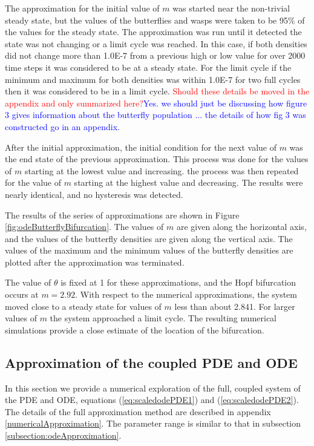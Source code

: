 \documentclass[review,authoryear]{elsarticle}
\begin{document}
The approximation for the initial value of $m$ was started near the
non-trivial steady state, but the values of the butterflies and wasps
were taken to be 95\% of the values for the steady state. The
approximation was run until it detected the state was not changing or
a limit cycle was reached. In this case, if both densities did not
change more than 1.0E-7 from a previous high or low value for over
2000 time steps it was considered to be at a steady state. For the
limit cycle if the minimum and maximum for both densities was within
1.0E-7 for two full cycles then it was considered to be in a limit
cycle. \textcolor{red}{Should these details be moved in the appendix and only summarized here?}\textcolor{blue}{Yes.  we should just be discussing how figure 3 gives information about the butterfly population ... the details of how fig 3 was constructed go in an appendix.}

After the initial approximation, the initial condition for the next
value of $m$ was the end state of the previous approximation. This
process was done for the values of $m$ starting at the lowest value
and increasing. the process was then repeated for the value of $m$
starting at the highest value and decreasing. The results were nearly
identical, and no hysteresis was detected.

The results of the series of approximations are shown in Figure
\ref{fig:odeButterflyBifurcation}. The values of $m$ are given along
the horizontal axis, and the values of the butterfly densities are
given along the vertical axis. The values of the maximum and the
minimum values of the butterfly densities are plotted after the
approximation was terminated.

The value of $\theta$ is fixed at 1 for these approximations, and the Hopf bifurcation occurs at $m=2.92$. With respect to the numerical approximations, the system moved close to a steady state for values of $m$ less than about 2.841. For larger values of $m$ the system approached a limit
cycle. The resulting numerical simulations provide a close estimate of the location of the bifurcation.

\subsection{Approximation of the coupled PDE and ODE}

In this section we provide a  numerical exploration of the full, coupled system of the PDE and
ODE, equations (\ref{eq:scaledodePDE1}) and (\ref{eq:scaledodePDE2}). The details of the full approximation method are
described in appendix \ref{numericalApproximation}. The parameter
range is similar to that in subsection
\ref{subsection:odeApproximation}.
\end{document}
